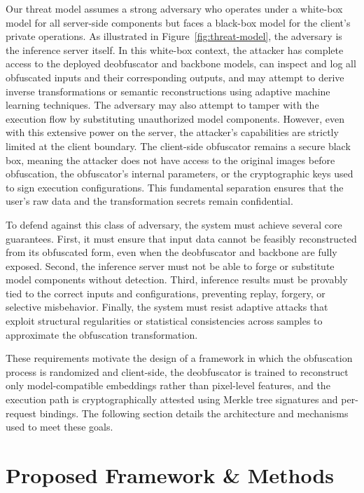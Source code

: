 \documentclass{ieeeaccess}
\begin{document}
{Our threat model assumes a strong adversary who operates under a white-box model for all server-side components but faces a black-box model for the client's private operations. As illustrated in Figure}~\ref{fig:threat-model}{, the adversary is the inference server itself. In this white-box context, the attacker has complete access to the deployed deobfuscator and backbone models, can inspect and log all obfuscated inputs and their corresponding outputs, and may attempt to derive inverse transformations or semantic reconstructions using adaptive machine learning techniques. The adversary may also attempt to tamper with the execution flow by substituting unauthorized model components. However, even with this extensive power on the server, the attacker's capabilities are strictly limited at the client boundary. The client-side obfuscator remains a secure black box, meaning the attacker does not have access to the original images before obfuscation, the obfuscator's internal parameters, or the cryptographic keys used to sign execution configurations. This fundamental separation ensures that the user's raw data and the transformation secrets remain confidential.}


To defend against this class of adversary, the system must achieve several core guarantees. First, it must ensure that input data cannot be feasibly reconstructed from its obfuscated form, even when the deobfuscator and backbone are fully exposed. Second, the inference server must not be able to forge or substitute model components without detection. Third, inference results must be provably tied to the correct inputs and configurations, preventing replay, forgery, or selective misbehavior. Finally, the system must resist adaptive attacks that exploit structural regularities or statistical consistencies across samples to approximate the obfuscation transformation.

These requirements motivate the design of a framework in which the obfuscation process is randomized and client-side, the deobfuscator is trained to reconstruct only model-compatible embeddings rather than pixel-level features, and the execution path is cryptographically attested using Merkle tree signatures and per-request bindings. The following section details the architecture and mechanisms used to meet these goals.


\section{Proposed Framework \& Methods} \label{sec:pro}
\end{document}
